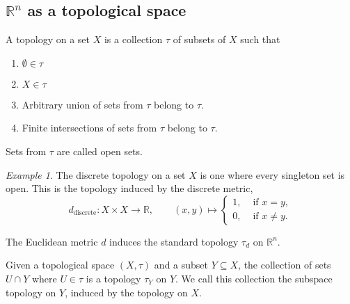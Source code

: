 \documentclass[11pt]{article}
\newcommand{\R}{\mathbb{R}}
\theoremstyle{definition}
\theoremstyle{remark}
\newtheorem*{example}{Example}
\numberwithin{equation}{section}
\begin{document}
    \subsection{$\R^n$ as a topological space}
    \begin{definition}
        A topology on a set $X$ is a collection $\tau$ of subsets of $X$ such that
        \begin{enumerate}
            \itemsep0em
            \item $\emptyset \in \tau$
            \item $X \in \tau$
            \item Arbitrary union of sets from $\tau$ belong to $\tau$.
            \item Finite intersections of sets from $\tau$ belong to $\tau$.
        \end{enumerate}
        Sets from $\tau$ are called open sets.
    \end{definition}
    \begin{example}
        The discrete topology on a set $X$ is one where every singleton set is open.
        This is the topology induced by the discrete metric, \[
            d_\text{discrete}\colon X\times X \to \R, \qquad
            (x, y) \mapsto \begin{cases}
                1, &\text{ if }x = y, \\
                0, &\text{ if }x \neq y.
            \end{cases}
        \] 
    \end{example}

    \begin{theorem}
        The Euclidean metric $d$ induces the standard topology $\tau_d$ on $\R^n$.
    \end{theorem}

    \begin{definition}
        Given a topological space $(X, \tau)$ and a subset $Y\subseteq X$, the
        collection of sets $U \cap Y$ where $U \in \tau$ is a topology $\tau_Y$ on
        $Y$. We call this collection the subspace topology on $Y$, induced by the
        topology on $X$.
    \end{definition}
\end{document}
